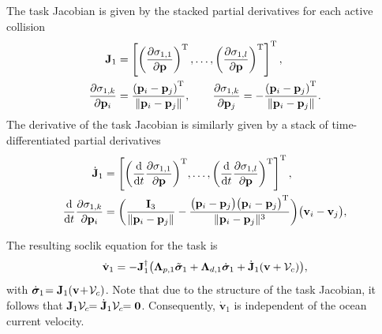 The task Jacobian is given by the stacked partial derivatives for each active collision
\begin{subequations}
\begin{align}
    \mathbf{J}_1 &= \left[\left(\frac{\partial \sigma_{1,1}}{\partial \mathbf{p}}\right)^{\mathrm{T}}, \ldots, \left(\frac{\partial \sigma_{1,l}}{\partial \mathbf{p}}\right)^{\mathrm{T}}\right]^{\mathrm{T}},\\
    \frac{\partial \sigma_{1,k}}{\partial \mathbf{p}_i} &=\frac{\left(\mathbf{p}_i-\mathbf{p}_j\right) ^{\mathrm{T}}}{\|\mathbf{p}_i - \mathbf{p}_j\|}, \qquad
    \frac{\partial \sigma_{1,k}}{\partial \mathbf{p}_j} = -\frac{\left(\mathbf{p}_i-\mathbf{p}_j\right) ^{\mathrm{T}}}{\|\mathbf{p}_i - \mathbf{p}_j\|}.
\end{align}
\end{subequations}
The derivative of the task Jacobian is similarly given by a stack of time-differentiated partial derivatives
\begin{subequations}
\begin{align}
    \dot{\mathbf{J}}_1 &= \left[{\left(\frac{{\rm d}}{{\rm d}t}\frac{\partial \sigma_{1,1}}{\partial \mathbf{p}}\right)}^{\mathrm{T}}, \ldots, {\left(\frac{{\rm d}}{{\rm d}t}\frac{\partial \sigma_{1,l}}{\partial \mathbf{p}}\right)}^{\mathrm{T}}\right]^{\mathrm{T}},\\
    {\frac{{\rm d}}{{\rm d}t}\frac{\partial \sigma_{1,k}}{\partial \mathbf{p}_i}} &= \bigg(\frac{\mathbf{I}_3}{\|\mathbf{p}_i - \mathbf{p}_j\|} - \frac{\bigl(\mathbf{p}_i-\mathbf{p}_j\bigr)\bigl(\mathbf{p}_i-\mathbf{p}_j\bigr)^{\mathrm{T}}}{\|\mathbf{p}_i - \mathbf{p}_j\|^3}\bigg)\bigl(\mathbf{v}_i-\mathbf{v}_j\bigr),
\end{align}
\end{subequations}

The resulting \gls{soclik} equation for the task is
\begin{equation}
    \dot{\mathbf{v}}_1 = -\mathbf{J}_1^\dagger \bigl( \mathbf{\Lambda}_{p,1}\Tilde{\bm{\sigma}}_1 + \mathbf{\Lambda}_{d,1} \dot{\bm{\sigma}}_1 + \dot{\mathbf{J}}_1 (\mathbf{v}+\mathcal{V}_c)\bigr),
\end{equation}
with $\dot{\bm{\sigma}}_{1\,} \!\!= \mathbf{J}_1 (\mathbf{v}\! + \!\mathcal{V}_c)$. %
Note that due to the structure of the task Jacobian, it follows that $\mathbf{J}_1 \mathcal{V}_c \!\!= \dot{\mathbf{J}}_1 \mathcal{V}_c \!\!= \mathbf{0}$. Consequently, $\dot{\mathbf{v}}_1$ is independent of the ocean current velocity.

